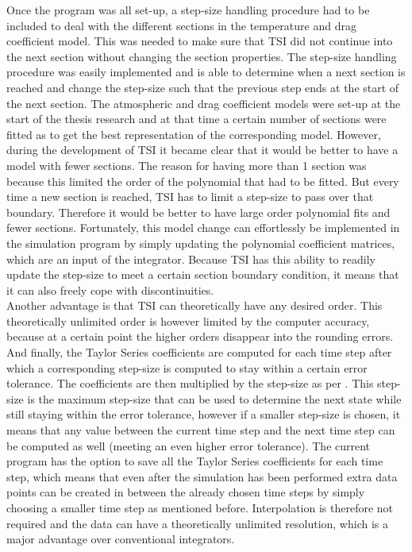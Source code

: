 \noindent
Once the program was all set-up, a step-size handling procedure had to be included to deal with the different sections in the temperature and drag coefficient model. This was needed to make sure that \ac{TSI} did not continue into the next section without changing the section properties. The step-size handling procedure was easily implemented and is able to determine when a next section is reached and change the step-size such that the previous step ends at the start of the next section. The atmospheric and drag coefficient models were set-up at the start of the thesis research and at that time a certain number of sections were fitted as to get the best representation of the corresponding model. However, during the development of \ac{TSI} it became clear that it would be better to have a model with fewer sections. The reason for having more than 1 section was because this limited the order of the polynomial that had to be fitted. But every time a new section is reached, \ac{TSI} has to limit a step-size to pass over that boundary. Therefore it would be better to have large order polynomial fits and fewer sections. Fortunately, this model change can effortlessly be implemented in the simulation program by simply updating the polynomial coefficient matrices, which are an input of the integrator. 
Because \ac{TSI} has this ability to readily update the step-size to meet a certain section boundary condition, it means that it can also freely cope with discontinuities.  \\
Another advantage is that \ac{TSI} can theoretically have any desired order. This theoretically unlimited order is however limited by the computer accuracy, because at a certain point the higher orders disappear into the rounding errors.\\
And finally, the Taylor Series coefficients are computed for each time step after which a corresponding step-size is computed to stay within a certain error tolerance. The coefficients are then multiplied by the step-size as per . This step-size is the maximum step-size that can be used to determine the next state while still staying within the error tolerance, however if a smaller step-size is chosen, it means that any value between the current time step and the next time step can be computed as well (meeting an even higher error tolerance). The current program has the option to save all the Taylor Series coefficients for each time step, which means that even after the simulation has been performed extra data points can be created in between the already chosen time steps by simply choosing a smaller time step as mentioned before. Interpolation is therefore not required and the data can have a theoretically unlimited resolution, which is a major advantage over conventional integrators.




